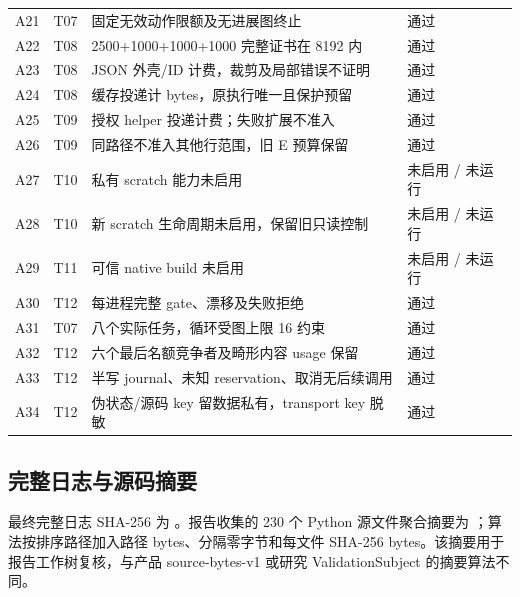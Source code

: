 \begin{longtable}{L{11mm}L{11mm}L{97mm}L{30mm}}
A21 & T07 & 固定无效动作限额及无进展图终止 & 通过\\
A22 & T08 & 2500+1000+1000+1000 完整证书在 8192 内 & 通过\\
A23 & T08 & JSON 外壳/ID 计费，裁剪及局部错误不证明 & 通过\\
A24 & T08 & 缓存投递计 bytes，原执行唯一且保护预留 & 通过\\
A25 & T09 & 授权 helper 投递计费；失败扩展不准入 & 通过\\
A26 & T09 & 同路径不准入其他行范围，旧 E 预算保留 & 通过\\
A27 & T10 & 私有 scratch 能力未启用 & 未启用 / 未运行\\
A28 & T10 & 新 scratch 生命周期未启用，保留旧只读控制 & 未启用 / 未运行\\
A29 & T11 & 可信 native build 未启用 & 未启用 / 未运行\\
A30 & T12 & 每进程完整 gate、漂移及失败拒绝 & 通过\\
A31 & T07 & 八个实际任务，循环受图上限 16 约束 & 通过\\
A32 & T12 & 六个最后名额竞争者及畸形内容 usage 保留 & 通过\\
A33 & T12 & 半写 journal、未知 reservation、取消无后续调用 & 通过\\
A34 & T12 & 伪状态/源码 key 留数据私有，transport key 脱敏 & 通过\\
\bottomrule\end{longtable}
\subsection{完整日志与源码摘要}
最终完整日志 SHA-256 为 。报告收集的 230 个 Python 源文件聚合摘要为 ；算法按排序路径加入路径 bytes、分隔零字节和每文件 SHA-256 bytes。该摘要用于报告工作树复核，与产品 source-bytes-v1 或研究 ValidationSubject 的摘要算法不同。

